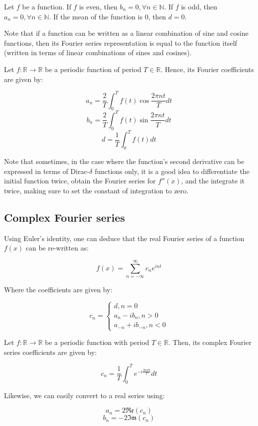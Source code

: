 \documentclass[12pt]{article}
\begin{document}
\begin{proposition}
    Let $f$ be a function. If $f$ is even, then $b_n = 0, \forall n \in \mathbb{N}$. If $f$ is odd, then $a_n = 0, \forall n \in \mathbb{N}$. If the mean of the function is $0$, then $d = 0$.
\end{proposition}

Note that if a function can be written as a linear combination of sine and cosine functions, then its Fourier series representation is equal to the function itself (written in terms of linear combinations of sines and cosines).

\begin{theorem}
    Let $f : \mathbb{R} \to \mathbb{R}$ be a periodic function of period $T \in \mathbb{R}$. Hence, its Fourier coefficients are given by:

    \[ a_n = \frac{2}{T}\int_0^T f(t)\cos{\frac{2\pi nt}{T}}dt \]
    \[ b_n = \frac{2}{T}\int_0^T f(t)\sin{\frac{2\pi nt}{T}}dt \]
    \[ d = \frac{1}{T}\int_0^T f(t)dt \]
\end{theorem}

Note that sometimes, in the case where the function's second derivative can be expressed in terms of Dirac-$\delta$ functions only, it is a good idea to differentiate the initial function twice, obtain the Fourier series for $f''(x)$, and the integrate it twice, making sure to set the constant of integration to zero.

\subsection{Complex Fourier series}
    
Using Euler's identity, one can deduce that the real Fourier series of a function $f(x)$ can be re-written as:

\[ f(x) = \sum_{n = -\infty}^\infty c_ne^{int} \]

Where the coefficients are given by:

\[ c_n = \begin{cases}
    d, n = 0 \\
    a_n - ib_n, n > 0 \\
    a_{-n} + ib_{-n}, n < 0
\end{cases} \]

\begin{theorem}
    Let $f : \mathbb{R} \to \mathbb{R}$ be a periodic function with period $T \in \mathbb{R}$. Then, its complex Fourier series coefficients are given by:

    \[ c_n = \frac{1}{T}\int_0^T e^{-i\frac{2n\pi t}{T}}dt \]
\end{theorem}

Likewise, we can easily convert to a real series using:

\[ a_n = 2\mathfrak{Re}(c_n) \]
\[ b_n = -2\mathfrak{Im}(c_n) \]
\end{document}
